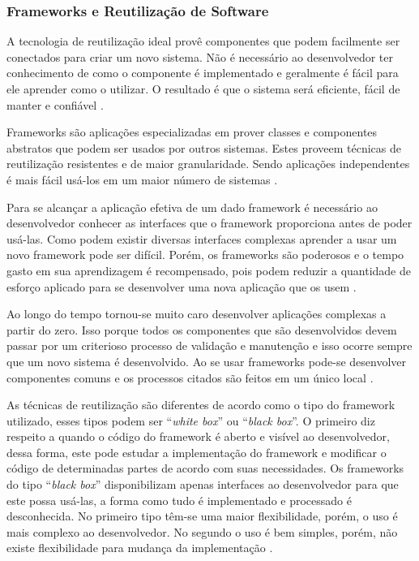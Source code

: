 \subsubsection{Frameworks e Reutilização de Software}

A tecnologia de reutilização ideal provê componentes que podem facilmente ser conectados para criar um novo sistema. Não é necessário ao desenvolvedor ter conhecimento de como o componente é implementado e geralmente é fácil para ele aprender como o utilizar. O resultado é que o sistema será eficiente, fácil de manter e confiável \cite{Johnson:1997}.

Frameworks são aplicações especializadas em prover classes e componentes abstratos que podem ser usados por outros sistemas. Estes proveem técnicas de reutilização resistentes e de maior granularidade. Sendo aplicações independentes é mais fácil usá-los em um maior número de sistemas \cite{Johnson:Foote:1988}.

Para se alcançar a aplicação efetiva de um dado framework é necessário ao desenvolvedor conhecer as interfaces que o framework proporciona antes de poder usá-las. Como podem existir diversas interfaces complexas aprender a usar um novo framework pode ser difícil. Porém, os frameworks são poderosos e o tempo gasto em sua aprendizagem é recompensado, pois podem reduzir a quantidade de esforço aplicado para se desenvolver uma nova aplicação que os usem \cite{Johnson:1997}.

Ao longo do tempo tornou-se muito caro desenvolver aplicações complexas a partir do zero. Isso porque todos os componentes que são desenvolvidos devem passar por um criterioso processo de validação e manutenção e isso ocorre sempre que um novo sistema é desenvolvido. Ao se usar frameworks pode-se desenvolver componentes comuns e os processos citados são feitos em um único local \cite{Fayad:Schimidt:1997}.

As técnicas de reutilização são diferentes de acordo como o tipo do framework utilizado, esses tipos podem ser ``\textit{white box}'' ou ``\textit{black box}''. O primeiro diz respeito a quando o código do framework é aberto e visível ao desenvolvedor, dessa forma, este pode estudar a implementação do framework e modificar o código de determinadas partes de acordo com suas necessidades. Os frameworks do tipo ``\textit{black box}'' disponibilizam apenas interfaces ao desenvolvedor para que este possa usá-las, a forma como tudo é implementado e processado é desconhecida. No primeiro tipo têm-se uma maior flexibilidade, porém, o uso é mais complexo ao desenvolvedor. No segundo o uso é bem simples, porém, não existe flexibilidade para mudança da implementação \cite{Kroth:2000}.

